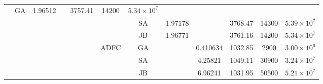 \begin{tabular}{c c c c c c c c c c c c}
     & GA & 1.96512 &  & 3757.41 & 14200 & $5.34 \times 10^{7}$ \\
&&&&&& SA & 1.97178 &  & 3768.47 & 14300 & $5.39 \times 10^{7}$ \\
&&&&&& JB & 1.96771 &  & 3761.16 & 14200 & $5.34 \times 10^{7}$ \\
  &&&&& \multirow{3}{*}{ADFC}
     & GA &  & 0.410634 & 1032.85 & 2900 & $3.00 \times 10^{6}$ \\
&&&&&& SA &  & 4.25821 & 1049.11 & 30900 & $3.24 \times 10^{7}$ \\
&&&&&& JB &  & 6.96241 & 1031.95 & 50500 & $5.21 \times 10^{7}$ \\
\bottomrule
\end{tabular}

